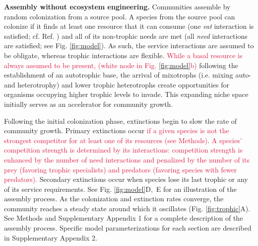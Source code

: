\documentclass[twocolumn,preprintnumbers,amsmath,amssymb,superscriptaddress,linenumbers]{revtex4-1}
\newcommand{\rev}[1]{\textcolor{crimson}{#1}}
\begin{document}
\vspace{0mm}
\noindent \textbf{Assembly without ecosystem engineering.}
\noindent Communities assemble by random colonization from a source pool.
A species from the source pool can colonize if it finds at least one resource that it can consume (one \emph{eat} interaction is satisfied; cf. Ref. ) and all of its non-trophic needs are met (all \emph{need} interactions are satisfied; see Fig. \ref{fig:model}).
As such, the service interactions are assumed to be obligate, whereas trophic interactions are flexible.
\rev{While a basal resource is always assumed to be present, (white node in Fig. \ref{fig:model}b)} following the establishment of an autotrophic base, the arrival of mixotrophs (i.e. mixing auto- and heterotrophy) and lower trophic heterotrophs create opportunities for organisms occupying higher trophic levels to invade.
This expanding niche space initially serves as an accelerator for community growth.

Following the initial colonization phase, extinctions begin to slow the rate of community growth.
Primary extinctions occur \rev{if a given species is not the strongest competitor for at least one of its resources (see Methods)}.
\rev{A species' competition strength is determined by its interactions: competition strength is enhanced by the number of need interactions and penalized by the number of its prey (favoring trophic specialists) and predators (favoring species with fewer predators).}
Secondary extinctions occur when species lose its last trophic or any of its service requirements.
See Fig. \ref{fig:model}D,~E for an illustration of the assembly process. 
As the colonization and extinction rates converge, the community reaches a steady state around which it oscillates (Fig. \ref{fig:trophic}A).
See Methods and Supplementary Appendix 1 for a complete description of the assembly process.
Specific model parameterizations for each section are described in Supplementary Appendix 2. %
\end{document}
